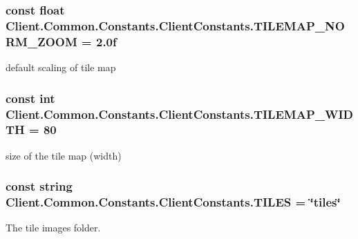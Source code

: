 \subsubsection[{T\+I\+L\+E\+M\+A\+P\+\_\+\+N\+O\+R\+M\+\_\+\+Z\+O\+O\+M}]{\setlength{\rightskip}{0pt plus 5cm}const float Client.\+Common.\+Constants.\+Client\+Constants.\+T\+I\+L\+E\+M\+A\+P\+\_\+\+N\+O\+R\+M\+\_\+\+Z\+O\+O\+M = 2.\+0f}\label{classClient_1_1Common_1_1Constants_1_1ClientConstants_a15c5a5cf12e8150acc1adc85b3c57a6a}


default scaling of tile map 

\hypertarget{classClient_1_1Common_1_1Constants_1_1ClientConstants_aabf156b0d8e71e288662a145f33ed1a9}{}
\subsubsection[{T\+I\+L\+E\+M\+A\+P\+\_\+\+W\+I\+D\+T\+H}]{\setlength{\rightskip}{0pt plus 5cm}const int Client.\+Common.\+Constants.\+Client\+Constants.\+T\+I\+L\+E\+M\+A\+P\+\_\+\+W\+I\+D\+T\+H = 80}\label{classClient_1_1Common_1_1Constants_1_1ClientConstants_aabf156b0d8e71e288662a145f33ed1a9}


size of the tile map (width) 

\hypertarget{classClient_1_1Common_1_1Constants_1_1ClientConstants_accb6c4f84c01e8e4adf87217b07985c0}{}
\subsubsection[{T\+I\+L\+E\+S}]{\setlength{\rightskip}{0pt plus 5cm}const string Client.\+Common.\+Constants.\+Client\+Constants.\+T\+I\+L\+E\+S = \char`\"{}tiles\char`\"{}}\label{classClient_1_1Common_1_1Constants_1_1ClientConstants_accb6c4f84c01e8e4adf87217b07985c0}


The tile images folder. 


